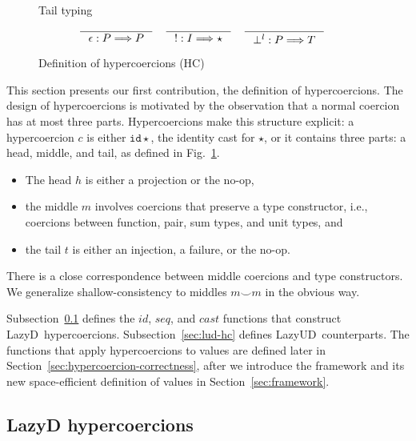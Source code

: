 \documentclass[acmsmall,review,anonymous]{acmart}\settopmatter{printfolios=true,printccs=false,printacmref=false}
\newcommand{\figref}[1]{Fig.~\ref{#1}}
\newcommand{\lazyUD}{Lazy\;UD}
\newcommand{\lazyD}{Lazy\;D}
\newcommand{\TOOdyn}[0]{\star}
\newcommand{\typingHC}[3]{#1 : #2 \Longrightarrow #3}
\newcommand{\hyperCoercionI}[0]{\mathtt{id\star}}
\begin{document}
\begin{figure}
    Tail typing \fbox{$\typingHC{t}{P}{T}$}
    \begin{gather*}
    \inference{}{\typingHC{\epsilon}{P}{P}} \quad
    \inference{}{\typingHC{!}{I}{\TOOdyn}} \quad
    \inference{}{\typingHC{\bot^l}{P}{T}} \quad
    \end{gather*}
  
  \caption{Definition of hypercoercions (HC)}
  \label{fig:hypercoercion}
\end{figure}

This section presents our first contribution, the definition of
hypercoercions.  The design of hypercoercions is motivated by the
observation that a normal coercion has at most three
parts. Hypercoercions make this structure explicit: a hypercoercion $c$ is
either $\hyperCoercionI$, the identity cast for $\TOOdyn$, or it contains
three parts: a head, middle, and tail, as defined in
\figref{fig:hypercoercion}.
\begin{itemize}
\item The head $h$ is either a projection or the no-op,
\item the middle $m$ involves coercions that preserve a type
  constructor, i.e., coercions between function, pair, sum types, and
  unit types, and
\item the tail $t$ is either an injection, a failure, or the no-op.
\end{itemize}
There is a close correspondence between middle coercions and type
constructors.  We generalize shallow-consistency to middles $m \smile
m$ in the obvious way.

Subsection~\ref{sec:ld-hc} defines the $id$, $seq$, and $cast$
functions that construct
\lazyD\ hypercoercions. Subsection~\ref{sec:lud-hc} defines
\lazyUD\ counterparts.  The functions that apply hypercoercions to
values are defined later in
Section~\ref{sec:hypercoercion-correctness}, after we introduce the framework 
and its new space-efficient definition of values in Section~\ref{sec:framework}.

\subsection{\lazyD{} hypercoercions}
\label{sec:ld-hc}
\end{document}

